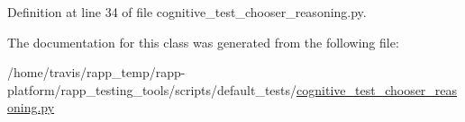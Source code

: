 Definition at line 34 of file cognitive\-\_\-test\-\_\-chooser\-\_\-reasoning.\-py.



The documentation for this class was generated from the following file\-:\begin{DoxyCompactItemize}
\item 
/home/travis/rapp\-\_\-temp/rapp-\/platform/rapp\-\_\-testing\-\_\-tools/scripts/default\-\_\-tests/\hyperlink{cognitive__test__chooser__reasoning_8py}{cognitive\-\_\-test\-\_\-chooser\-\_\-reasoning.\-py}\end{DoxyCompactItemize}
